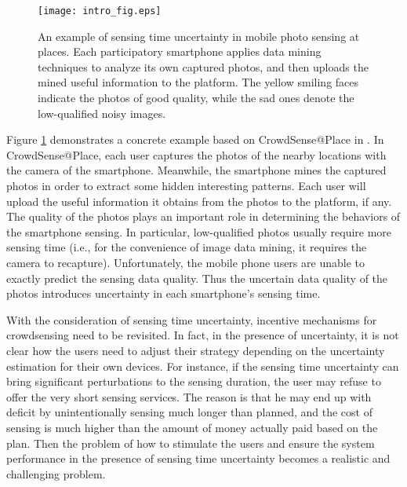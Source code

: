 \documentclass{IEEEtran}
\begin{document}
\begin{figure}
\centering
\texttt{[image: intro\_fig.eps]}
\caption{An example of sensing {\color{black}time} uncertainty in mobile photo sensing at places. Each participatory smartphone applies data mining techniques to analyze its own captured photos, and then uploads the mined useful information to the platform. The yellow smiling faces indicate the photos of good quality, while the sad ones denote the low-qualified noisy images.}
\label{fig:illustrate}
\end{figure}

Figure \ref{fig:illustrate} demonstrates a concrete example based on CrowdSense@Place in \cite{chon2012automatically}. In CrowdSense@Place, each user captures the photos of the nearby locations with the camera of the smartphone. Meanwhile, the smartphone mines the captured photos in order to extract some hidden interesting patterns. Each user will upload the useful information it obtains from the photos to the platform, if any. The quality of the photos plays an important role in determining the behaviors of the smartphone sensing. %
In particular, low-qualified photos usually require more sensing time (i.e., for the convenience of image data mining, it requires the camera to recapture). Unfortunately, the mobile phone users are unable to exactly predict the sensing data quality. Thus the uncertain data quality of the photos introduces uncertainty in each smartphone's sensing {\color{black}time}. %

With the consideration of sensing {\color{black}time} uncertainty, incentive mechanisms for crowdsensing need to be revisited.
In fact, in the presence of uncertainty, it is not clear how the users need to adjust their strategy depending on the uncertainty estimation for their own devices. For instance, %
if the sensing {\color{black}time} uncertainty can bring significant perturbations to the sensing duration, the user may refuse to offer the very short sensing services. The reason is that he may end up with deficit by unintentionally sensing much longer than planned, and the cost of sensing is much higher than the amount of money actually paid based on the plan. Then {\color{black}the problem of} how to stimulate the users and ensure the system performance in the presence of sensing {\color{black}time} uncertainty becomes a realistic and challenging problem.
\end{document}

